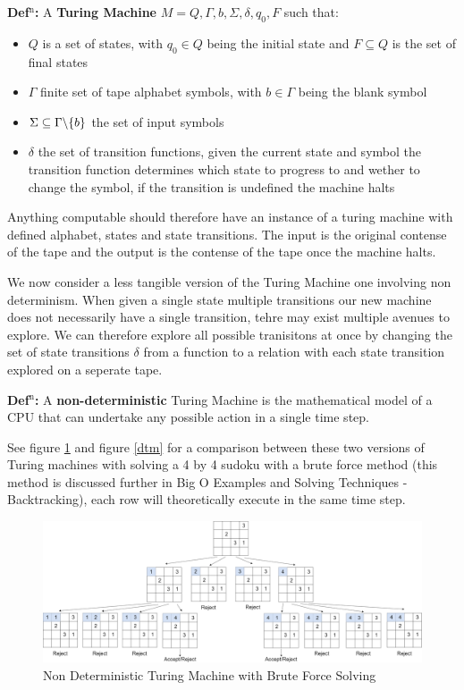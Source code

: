 \documentclass[a4paper,11pt]{report}
\newcounter{row}
\begin{document}
\textbf{Def$^\text{n}$:} A \textbf{Turing Machine} $M={Q,\Gamma,b,\Sigma, \delta, q_0, F}$ such that:
\begin{itemize}
\item $Q$ is a set of states, with $q_0\in Q$ being the initial state and $F\subseteq Q$ is the set of final states
\item $\Gamma$ finite set of tape alphabet symbols, with $b\in \Gamma$ being the blank symbol
\item $\Sigma\subseteq \Gamma \symbol{92} \{b\}$ the set of input symbols
\item $\delta$ the set of transition functions, given the current state and symbol the transition function determines which state to progress to and wether to change the symbol, if the transition is undefined the machine halts
\end{itemize}

Anything computable should therefore have an instance of a turing machine with defined alphabet, states and state transitions. The input is the original contense of the tape and the output is the contense of the tape once the machine halts. 

We now consider a less tangible version of the Turing Machine one involving non determinism. When given a single state multiple transitions our new machine does not necessarily have a single transition, tehre may exist multiple avenues to explore. We can therefore explore all possible tranisitons at once by changing the set of state transitions $\delta$ from a function to a relation with each state transition explored on a seperate tape. 

\textbf{Def$^\text{n}$:} A \textbf{non-deterministic} Turing Machine is the mathematical model of a CPU that can undertake any possible action in a single time step.

See figure \ref{ndtm} and figure \ref{dtm} for a comparison between these two versions of Turing machines with solving a 4 by 4 sudoku with a brute force method (this method is discussed further in Big O Examples and Solving Techniques - Backtracking), each row will theoretically execute in the same time step.

\begin{figure}[h!]
	\begin{center}
		\includegraphics[width=180mm]{figures/turing_non_determinism.png}
	\end{center}
	\caption{\label{ndtm} Non Deterministic Turing Machine with Brute Force Solving}
\end{figure}
\end{document}
